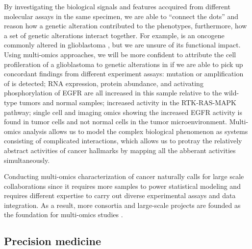 By investigating the biological signals and features accquired from different molecular assays in the same specimen, we are able to ``connect the dots'' and reason how a genetic alteration contributed to the phenotypes, furthermore, how a set of genetic alterations interact together. For example,  is an oncogene commonly altered in glioblastoma \cite{eskilssone_miletich:EGFRHeterogeneity2018}, but we are unsure of its functional impact. Using multi-omics approaches, we will be more confident to attribute the cell profileration of a glioblastoma to genetic alterations in  if we are able to pick up concordant findings from different experiment assays: mutation or amplification of  is detected; RNA expression, protein abundance, and activating phosphorylation of EGFR are all increased in this sample relative to the wild-type tumors and normal samples; increased activity in the RTK-RAS-MAPK pathway; single cell and imaging omics showing the increased EGFR activity is found in tumor cells and not normal cells in the tumor microenvironment. Multi-omics analysis allows us to model the complex biological phenomenon as systems consisting of complicated interactions, which allows us to protray the relatively abstract activities of cancer hallmarks by mapping all the abberant activities simultaneously.

Conducting multi-omics characterization of cancer naturally calls for large scale collaborations since it requires more samples to power statistical modeling and requires different expertise to carry out diverse experimental assays and data integration. As a result, more consortia and large-scale projects are founded as the foundation for multi-omics studies \cite{hutterc_zenklusenjc:CancerGenome2018,rozenblatt-roseno_zhuangx:HumanTumor2020,rodriguezh_lowydr:NextHorizon2021}.


\subsection{Precision medicine}




